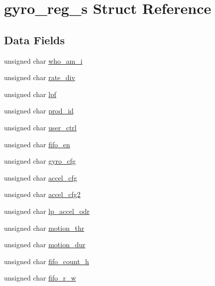 \hypertarget{structgyro__reg__s}{}\section{gyro\+\_\+reg\+\_\+s Struct Reference}
\label{structgyro__reg__s}
\subsection*{Data Fields}
\begin{DoxyCompactItemize}
\item 
unsigned char \hyperlink{structgyro__reg__s_aa52d78bb2b62fee23a0b759e545dba4b}{who\+\_\+am\+\_\+i}
\item 
unsigned char \hyperlink{structgyro__reg__s_a401bb6ee7e48a2bf55398cbaf70c0dc3}{rate\+\_\+div}
\item 
unsigned char \hyperlink{structgyro__reg__s_a0a4067140c6a3704b4312ba62b77aadb}{lpf}
\item 
unsigned char \hyperlink{structgyro__reg__s_ae6ca290ca1a107f4cb7986047071d7d9}{prod\+\_\+id}
\item 
unsigned char \hyperlink{structgyro__reg__s_ad8384710853dc1f9580b9ff19e87efbc}{user\+\_\+ctrl}
\item 
unsigned char \hyperlink{structgyro__reg__s_a480d2fa5db4e9c42c61d886d09c5e448}{fifo\+\_\+en}
\item 
unsigned char \hyperlink{structgyro__reg__s_ac2b87a25876eb44862043cd56d33d49b}{gyro\+\_\+cfg}
\item 
unsigned char \hyperlink{structgyro__reg__s_a3e39cea9e122765d4770876d4ce6adc7}{accel\+\_\+cfg}
\item 
unsigned char \hyperlink{structgyro__reg__s_a4878318dd0c9243015d4963e00b2d954}{accel\+\_\+cfg2}
\item 
unsigned char \hyperlink{structgyro__reg__s_a14a0bff136c827f3f58f619f8045788b}{lp\+\_\+accel\+\_\+odr}
\item 
unsigned char \hyperlink{structgyro__reg__s_a31322df7c5727b98480d1fcb18e040c5}{motion\+\_\+thr}
\item 
unsigned char \hyperlink{structgyro__reg__s_af858b8611ee183ec175c41ddb5db3511}{motion\+\_\+dur}
\item 
unsigned char \hyperlink{structgyro__reg__s_a769e352846cc0f576d321f5655f7c11c}{fifo\+\_\+count\+\_\+h}
\item 
unsigned char \hyperlink{structgyro__reg__s_a698342c34cc426e84e3435c6b46da120}{fifo\+\_\+r\+\_\+w}
\item 

\end{DoxyCompactItemize}
